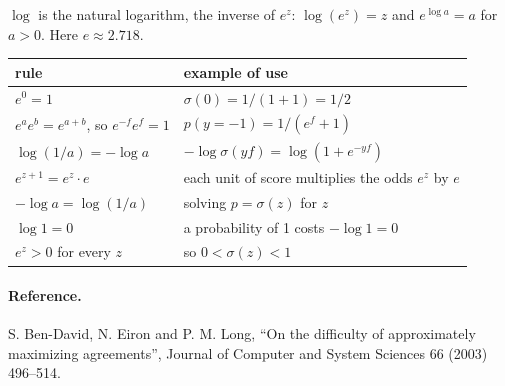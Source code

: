 \documentclass[11pt]{article}
\begin{document}
$\log$ is the natural logarithm, the inverse of $e^z$: $\log(e^z) = z$ and $e^{\log a} = a$ for
$a > 0$. Here $e \approx 2.718$.

\begin{center}
\renewcommand{\arraystretch}{1.3}
\begin{tabular}{ll}
  \toprule
  rule & example of use \\
  \midrule
  $e^{0} = 1$ & $\sigma(0) = 1/(1 + 1) = 1/2$ \\
  $e^{a} e^{b} = e^{a + b}$, so $e^{-f} e^{f} = 1$ & $p(y = -1) = 1/(e^{f} + 1)$ \\
  $\log(1/a) = -\log a$ & $-\log \sigma(y f) = \log(1 + e^{-y f})$ \\
  $e^{z + 1} = e^{z} \cdot e$ & each unit of score multiplies the odds $e^{z}$ by $e$ \\
  $-\log a = \log(1/a)$ & solving $p = \sigma(z)$ for $z$ \\
  $\log 1 = 0$ & a probability of 1 costs $-\log 1 = 0$ \\
  $e^{z} > 0$ for every $z$ & so $0 < \sigma(z) < 1$ \\
  \bottomrule
\end{tabular}
\end{center}

\paragraph{Reference.} S. Ben-David, N. Eiron and P. M. Long, ``On the difficulty of approximately
maximizing agreements'', Journal of Computer and System Sciences 66 (2003) 496--514.
\end{document}
